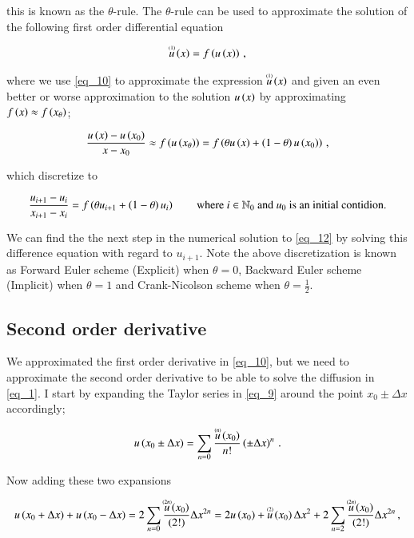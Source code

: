 \documentclass[11pt,english,a4paper]{article}
\begin{document}
\begin{flushleft}
this is known as the $\theta$-rule. The $\theta$-rule can be used to approximate the solution of the following first order differential equation

\begin{align}
\T{u}{(1)}\p{x} = f\p{u\p{x}} \,,
\label{eq_12}
\end{align}

where we use \eqref{eq_10} to approximate the expression $\T{u}{(1)}\p{x}$ and given an even better or worse approximation to the solution $u\p{x}$ by approximating $f\p{x}\approx f\p{x_{\theta}}$;

\begin{align*}
\frac{u\p{x}-u\p{x_0}}{x-x_0} \approx f\p{u\p{x_{\theta}}} = f\p{\theta u\p{x} + \p{1-\theta}u\p{x_0}}\,,
\end{align*}

which discretize to

\begin{align}
\frac{u_{i+1}-u_i}{x_{i+1}-x_i} = f\p{\theta u_{i+1} + \p{1-\theta}u_i} \qquad \text{where } i\in\mathbb{N}_0 \text{ and $u_0$ is an initial contidion.} 
\label{eq_13}
\end{align}

We can find the the next step in the numerical solution to \eqref{eq_12} by solving this difference equation with regard to $u_{i+1}$. Note the above discretization is known as Forward Euler scheme (Explicit) when $\theta = 0$, Backward Euler scheme (Implicit) when $\theta = 1$ and Crank-Nicolson scheme when $\theta = \frac{1}{2}$.

\subsection{Second order derivative}

We approximated the first order derivative in \eqref{eq_10}, but we need to approximate the second order derivative to be able to solve the diffusion in \eqref{eq_1}. I start by expanding the Taylor series in \eqref{eq_9} around the point $x_0\pm\Delta x$ accordingly;

\begin{align}
u\p{x_0\pm\Delta x} = \sum_{n=0} \frac{\T{u}{(n)}\p{x_0}}{n!}\p{\pm\Delta x}^n\,.
\label{eq_14}
\end{align}

Now adding these two expansions

\begin{align*}
u\p{x_0+\Delta x} + u\p{x_0-\Delta x} = 2\sum_{n=0} \frac{\T{u}{(2n)}\p{x_0}}{(2!)}\Delta x^{2n} = 2 u\p{x_0} + \T{u}{(2)}\p{x_0}\Delta x^2 + 2\sum_{n=2} \frac{\T{u}{(2n)}\p{x_0}}{(2!)}\Delta x^{2n}\,,
\end{align*}


\end{flushleft}
\end{document}
